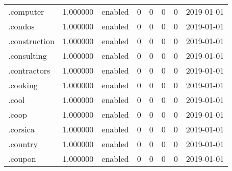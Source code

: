 \begin{tabular}{lrlrrrrl}
.computer                 &          1.000000 &         enabled &                           0 &                           0 &                           0 &                   0 &           2019-01-01 \\
.condos                   &          1.000000 &         enabled &                           0 &                           0 &                           0 &                   0 &           2019-01-01 \\
.construction             &          1.000000 &         enabled &                           0 &                           0 &                           0 &                   0 &           2019-01-01 \\
.consulting               &          1.000000 &         enabled &                           0 &                           0 &                           0 &                   0 &           2019-01-01 \\
.contractors              &          1.000000 &         enabled &                           0 &                           0 &                           0 &                   0 &           2019-01-01 \\
.cooking                  &          1.000000 &         enabled &                           0 &                           0 &                           0 &                   0 &           2019-01-01 \\
.cool                     &          1.000000 &         enabled &                           0 &                           0 &                           0 &                   0 &           2019-01-01 \\
.coop                     &          1.000000 &         enabled &                           0 &                           0 &                           0 &                   0 &           2019-01-01 \\
.corsica                  &          1.000000 &         enabled &                           0 &                           0 &                           0 &                   0 &           2019-01-01 \\
.country                  &          1.000000 &         enabled &                           0 &                           0 &                           0 &                   0 &           2019-01-01 \\
.coupon                   &          1.000000 &         enabled &                           0 &                           0 &                           0 &                   0 &           2019-01-01 \\

\end{tabular}
